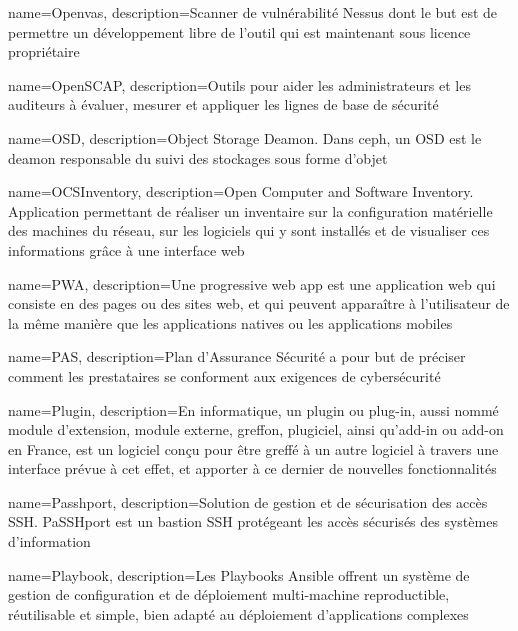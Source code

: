 {
    name=Openvas,
    description={Scanner de vulnérabilité Nessus dont le but est de permettre un développement libre de l’outil qui est maintenant sous licence propriétaire}
}

{
    name=OpenSCAP,
    description={Outils pour aider les administrateurs et les auditeurs à évaluer, mesurer et appliquer les lignes de base de sécurité}
}

{
    name=OSD,
    description={Object Storage Deamon. Dans ceph, un OSD est le deamon responsable du suivi des stockages sous forme d'objet}
}

{
    name=OCSInventory,
    description={Open Computer and Software Inventory. Application permettant de réaliser un inventaire sur la configuration matérielle des machines du réseau, sur les logiciels qui y sont installés et de visualiser ces informations grâce à une interface web}
}

{
    name=PWA,
    description={Une progressive web app est une application web qui consiste en des pages ou des sites web, et qui peuvent apparaître à l'utilisateur de la même manière que les applications natives ou les applications mobiles}
}

{
    name=PAS,
    description={Plan d'Assurance Sécurité a pour but de préciser comment les prestataires se conforment aux exigences de cybersécurité}
}

{
    name=Plugin,
    description={En informatique, un plugin ou plug-in, aussi nommé module d'extension, module externe, greffon, plugiciel, ainsi qu'add-in ou add-on en France, est un logiciel conçu pour être greffé à un autre logiciel à travers une interface prévue à cet effet, et apporter à ce dernier de nouvelles fonctionnalités}
}

{
    name=Passhport,
    description={Solution de gestion et de sécurisation des accès SSH. PaSSHport est un bastion SSH protégeant les accès sécurisés des systèmes d'information}
}

{
    name=Playbook,
    description={Les Playbooks Ansible offrent un système de gestion de configuration et de déploiement multi-machine reproductible, réutilisable et simple, bien adapté au déploiement d'applications complexes}
}


